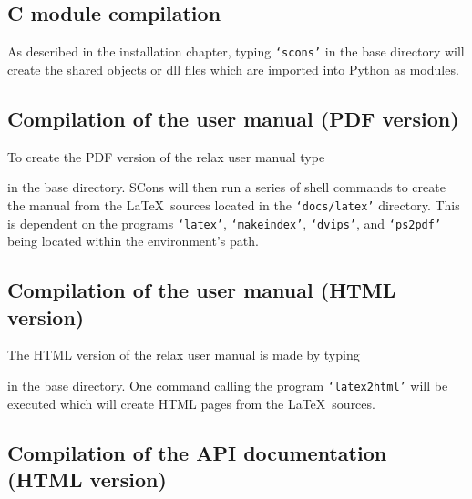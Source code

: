 \subsection{C module compilation}

As described in the installation chapter, typing \texttt{`scons'} in the base directory will create the shared objects or dll files which are imported into Python as modules.



\subsection{Compilation of the user manual (PDF version)}

To create the PDF version of the relax user manual type


in the base directory.  SCons will then run a series of shell commands to create the manual from the \LaTeX\ sources located in the \texttt{`docs/latex'} directory.  This is dependent on the programs \texttt{`latex'}, \texttt{`makeindex'}, \texttt{`dvips'}, and \texttt{`ps2pdf'} being located within the environment's path.



\subsection{Compilation of the user manual (HTML version)}

The HTML version of the relax user manual is made by typing


in the base directory.  One command calling the program \texttt{`latex2html'} will be executed which will create HTML pages from the \LaTeX\ sources.



\subsection{Compilation of the API documentation (HTML version)}

